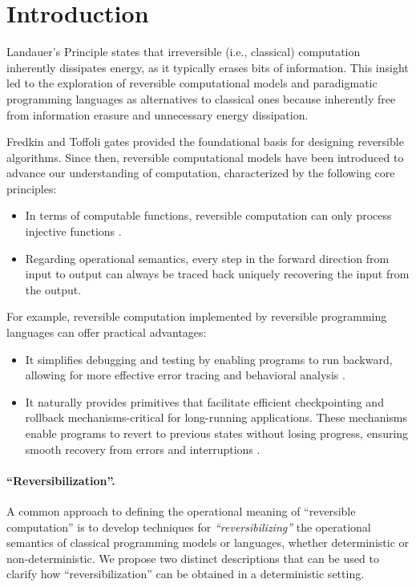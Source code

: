 \section{Introduction}
\label{section:Introduction}
Landauer's Principle \cite{landauer1961irreversibility} states that irreversible (i.e., classical) computation inherently dissipates energy, as it typically erases bits of information. This insight led to the exploration of reversible computational models and paradigmatic programming languages as alternatives to classical ones because inherently free from information erasure and unnecessary energy dissipation.

Fredkin and Toffoli gates \cite{Toffoli1980,FredkinToffoli1982} provided the foundational basis for designing reversible algorithms. Since then, reversible computational models have been introduced to advance our understanding of computation, characterized by the following core principles:
\begin{itemize}
    \item In terms of computable functions, reversible computation can only process injective functions \cite{Axelsen2011WhatDR}.
    \item Regarding operational semantics, every step in the forward direction from input to output can always be traced back uniquely recovering the input from the output.
\end{itemize}

\noindent
For example, reversible computation implemented by reversible programming languages can offer practical advantages:
\begin{itemize}
    \item It simplifies debugging and testing by enabling programs to run backward, allowing for more effective error tracing and behavioral analysis \cite{LaneseG:rc24}.
    \item It naturally provides primitives that facilitate efficient checkpointing and rollback mechanisms-critical for long-running applications. These mechanisms enable programs to revert to previous states without losing progress, ensuring smooth recovery from errors and interruptions \cite{perumalla2013introduction}.
\end{itemize}


\paragraph{``Reversibilization''.}
A common approach to defining the operational meaning of ``reversible computation'' is to develop techniques for \emph{``reversibilizing''} the operational semantics of classical programming models or languages, whether deterministic or non-deterministic. We propose two distinct descriptions that can be used to clarify how ``reversibilization'' can be obtained in a deterministic setting. 

